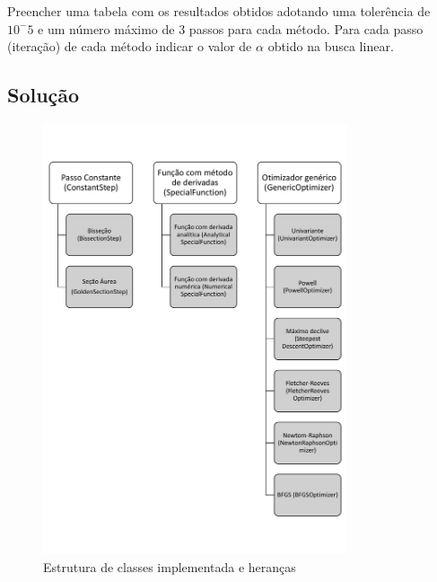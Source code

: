 \documentclass[10pt, a4paper]{article}
\begin{document}
Preencher uma tabela com os resultados obtidos adotando uma tolerência de $10^-5$ e um número máximo de 3 passos para cada método. Para cada passo (iteração)
de cada método indicar o valor de $\alpha$ obtido na busca linear.


\subsection{Solução}

\lipsum[1-2]

\begin{figure}[htpb]
  \centering
  \includegraphics[width=0.8\textwidth]{../general/classes_full.pdf}
  \caption{Estrutura de classes implementada e heranças}
  \label{fig:q1_1}
\end{figure}
\end{document}
